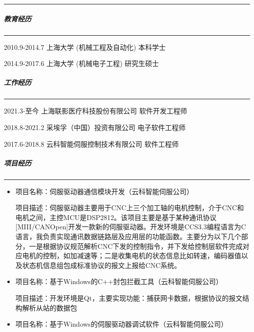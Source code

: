 \documentclass[
]{article}
\begin{document}
\begin{CJK}{UTF8}{gbsn}
\begin{center}\rule{0.5\linewidth}{0.5pt}\end{center}

\hypertarget{ux6559ux80b2ux7ecfux5386}{%
\subparagraph{教育经历}\label{ux6559ux80b2ux7ecfux5386}}

\begin{center}\rule{0.5\linewidth}{0.5pt}\end{center}

    
        2010.9-2014.7
        上海大学  (机械工程及自动化)
        本科\textbar 学士
    
        
        2014.9-2017.6
        上海大学  (机械电子工程)
         研究生\textbar 硕士
    

\hypertarget{ux5de5ux4f5cux7ecfux5386}{%
\subparagraph{工作经历}\label{ux5de5ux4f5cux7ecfux5386}}

\begin{center}\rule{0.5\linewidth}{0.5pt}\end{center}

    
	    2021.3-至今
        上海联影医疗科技股份有限公司
        软件开发工程师
    
        
        2018.8-2021.2
        采埃孚（中国）投资有限公司
        电子软件工程师
    
        
        2017.6-2018.8
        云科智能伺服控制技术有限公司
        软件工程师
    

\hypertarget{ux9879ux76eeux7ecfux5386}{%
\subparagraph{项目经历}\label{ux9879ux76eeux7ecfux5386}}

\begin{center}\rule{0.5\linewidth}{0.5pt}\end{center}

\begin{itemize}
\item
  项目名称：伺服驱动器通信模块开发（云科智能伺服公司）

  项目描述：伺服驱动器主要用于CNC上三个加工轴的电机控制，介于CNC和电机之间，主控MCU是DSP2812。该项目主要是基于某种通讯协议{[}MIII/CANOpen{]}开发一款新的伺服驱动器。开发环境是CCS3.3编程语言为C语言，我负责实现通讯数据链路层及应用层的功能函数。主要分为以下几个部分，一是根据协议规范解析CNC下发的控制指令，并下发给控制层软件完成对应电机的控制，如加减速等；二是收集电机的状态信息比如转速，编码器值以及状态机信息组包成标准协议的报文上报给CNC系统。
\item
  项目名称：基于Windows的C++封包拦截工具（云科智能伺服公司）

  项目描述：开发环境是Qt，主要实现功能：捕获网卡数据，根据协议的报文结构解析从站的数据包
\item
  项目名称：基于Windows的伺服驱动器调试软件（云科智能伺服公司）


\end{itemize}
\end{CJK}
\end{document}
